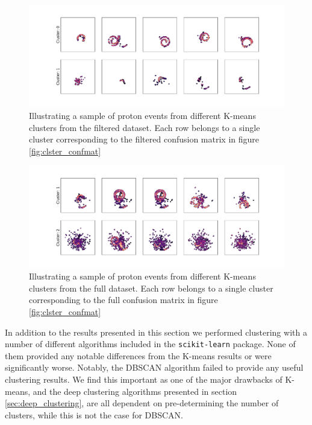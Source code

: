 \begin{figure}
\includegraphics[width=\textwidth]{plots/filtered_vgg_cluster_repr.pdf}
\caption[Filtered proton samples by cluster belonging]{Illustrating a sample of proton events from different K-means clusters from the filtered dataset. Each row belongs to a single cluster corresponding to the filtered confusion matrix in figure \ref{fig:clster_confmat}}\label{fig:filtered_vgg_clster_repr}
\end{figure} 

\begin{figure}
\includegraphics[width=\textwidth]{plots/full_vgg_cluster_repr.pdf}
\caption[Full proton samples by cluster belonging]{Illustrating a sample of proton events from different K-means clusters from the full dataset. Each row belongs to a single cluster corresponding to the full confusion matrix in figure \ref{fig:clster_confmat}}\label{fig:full_vgg_clster_repr}
\end{figure} 

In addition to the results presented in this section we performed clustering with a number of different algorithms included in the \lstinline{scikit-learn} package. None of them provided any notable differences from the K-means results or were significantly worse. Notably, the DBSCAN algorithm failed to provide any useful clustering results. We find this important as one of the major drawbacks of K-means, and the deep clustering algorithms presented in section \ref{sec:deep_clustering}, are all dependent on pre-determining the number of clusters, while this is not the case for DBSCAN. 